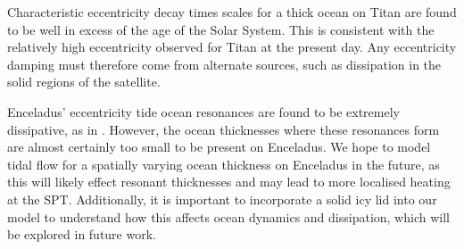 Characteristic eccentricity decay times scales for a thick ocean on Titan are found to be well in excess of the age of the Solar System. This is consistent with the relatively high eccentricity observed for Titan at the present day. Any eccentricity damping must therefore come from alternate sources, such as dissipation in the solid regions of the satellite.

Enceladus' eccentricity tide ocean resonances are found to be extremely dissipative, as in \citet{tyler2011tidal, matsuyama2014tidal}. However, the ocean thicknesses where these resonances form are almost certainly too small to be present on Enceladus. We hope to model tidal flow for a spatially varying ocean thickness on Enceladus in the future, as this will likely effect resonant thicknesses and may lead to more localised heating at the SPT. Additionally, it is important to incorporate a solid icy lid into our model to understand how this affects ocean dynamics and dissipation, which will be explored in future work. 